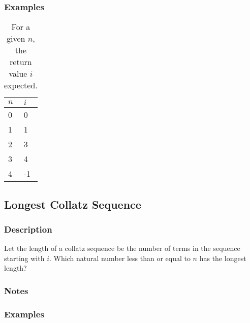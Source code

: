 \documentclass{article}
\begin{document}
\subsubsection{Examples}

\begin{table}[ht]
    \begin{tabular}{|l|l|}
    \hline
    {$n$} & {$i$} \\
    \hline
    0 & 0 \\
    1 & 1 \\
    2 & 3 \\
    3 & 4 \\
    4 & -1 \\
    \hline
  \end{tabular}
  \caption{For a given $n$, the return value $i$ expected.}
\end{table}

\subsection{Longest Collatz Sequence}
\subsubsection{Description}
Let the length of a collatz sequence be the number of terms in the sequence starting with $i$.
Which natural number less than or equal to $n$ has the longest length?

\subsubsection{Notes}
\blindtext

\subsubsection{Examples}
\blindtext
\end{document}
